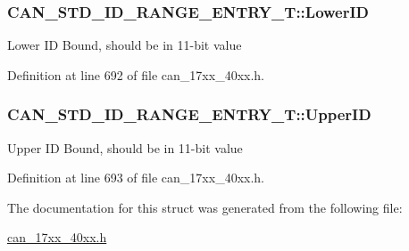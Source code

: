 \subsubsection[{\texorpdfstring{Lower\+ID}{LowerID}}]{ C\+A\+N\+\_\+\+S\+T\+D\+\_\+\+I\+D\+\_\+\+R\+A\+N\+G\+E\+\_\+\+E\+N\+T\+R\+Y\+\_\+\+T\+::\+Lower\+ID}\hypertarget{structCAN__STD__ID__RANGE__ENTRY__T_a8e71d9944856371e26c1f42fcdc124f7}{}\label{structCAN__STD__ID__RANGE__ENTRY__T_a8e71d9944856371e26c1f42fcdc124f7}
Lower ID Bound, should be in 11-\/bit value 

Definition at line 692 of file can\+\_\+17xx\+\_\+40xx.\+h.

\subsubsection[{\texorpdfstring{Upper\+ID}{UpperID}}]{ C\+A\+N\+\_\+\+S\+T\+D\+\_\+\+I\+D\+\_\+\+R\+A\+N\+G\+E\+\_\+\+E\+N\+T\+R\+Y\+\_\+\+T\+::\+Upper\+ID}\hypertarget{structCAN__STD__ID__RANGE__ENTRY__T_a5c92aad98ca02e625a651b5509a4bd6e}{}\label{structCAN__STD__ID__RANGE__ENTRY__T_a5c92aad98ca02e625a651b5509a4bd6e}
Upper ID Bound, should be in 11-\/bit value 

Definition at line 693 of file can\+\_\+17xx\+\_\+40xx.\+h.



The documentation for this struct was generated from the following file\+:\begin{DoxyCompactItemize}
\item 
\hyperlink{can__17xx__40xx_8h}{can\+\_\+17xx\+\_\+40xx.\+h}\end{DoxyCompactItemize}

